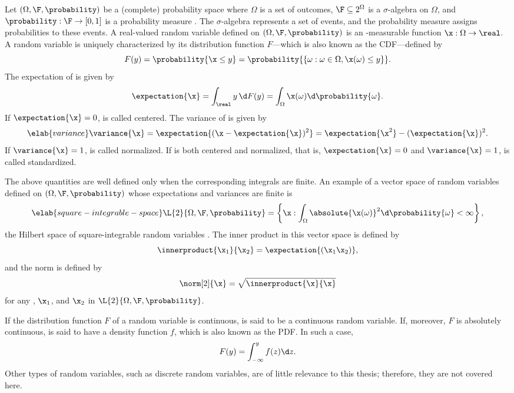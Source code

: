 Let $(\Omega, \F, \probability)$ be a (complete) probability space where
$\Omega$ is a set of outcomes, $\F \subseteq 2^\Omega$ is a $\sigma$-algebra on
$\Omega$, and $\probability: \F \to [0, 1]$ is a probability measure
\cite{durrett2010}. The $\sigma$-algebra represents a set of events, and the
probability measure assigns probabilities to these events. A real-valued random
variable defined on $(\Omega, \F, \probability)$ is an \F-measurable function
$\x: \Omega \to \real$. A random variable \x is uniquely characterized by its
distribution function $F$---which is also known as the \ac{CDF}---defined by
\begin{equation*}
  F(y) = \probability{\x \leq y} = \probability{\{ \omega: \omega \in \Omega, \x(\omega) \leq y \}}.
\end{equation*}
The expectation of \x is given by
\[
  \expectation{\x} = \int_\real y \, \d F(y) = \int_\Omega \x(\omega) \d \probability{\omega}.
\]
If $\expectation{\x} = 0$, \x is called centered. The variance of \x is given
by
\begin{equation} \elab{variance}
  \variance{\x}
  = \expectation{(\x - \expectation{\x})^2}
  = \expectation{\x^2} - (\expectation{\x})^2.
\end{equation}
If $\variance{\x} = 1$, \x is called normalized. If \x is both centered and
normalized, that is, $\expectation{\x} = 0$ and $\variance{\x} = 1$, \x is
called standardized.

The above quantities are well defined only when the corresponding integrals are
finite. An example of a vector space of random variables defined on $(\Omega,
\F, \probability)$ whose expectations and variances are finite is
\begin{equation} \elab{square-integrable-space}
  \L{2}{\Omega, \F, \probability} = \left\{ \x: \int_\Omega \absolute{\x(\omega)}^2 \d \probability{\omega} < \infty \right\},
\end{equation}
the Hilbert space of square-integrable random variables \cite{janson1997}. The
inner product in this vector space is defined by
\[
  \innerproduct{\x_1}{\x_2} = \expectation{(\x_1 \x_2)},
\]
and the norm is defined by
\[
  \norm[2]{\x} = \sqrt{\innerproduct{\x}{\x}}
\]
for any \x, $\x_1$, and $\x_2$ in $\L{2}{\Omega, \F, \probability}$.

If the distribution function $F$ of a random variable \x is continuous, \x is
said to be a continuous random variable. If, moreover, $F$ is absolutely
continuous, \x is said to have a density function $f$, which is also known as
the \ac{PDF}. In such a case,
\[
  F(y) = \int_{-\infty}^y f(z) \d z.
\]
Other types of random variables, such as discrete random variables, are of
little relevance to this thesis; therefore, they are not covered here.

